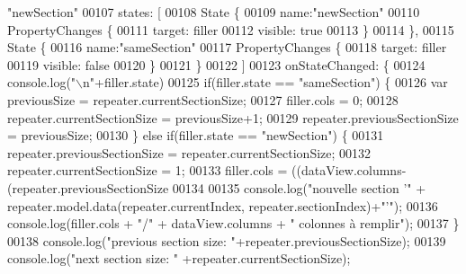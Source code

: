 \begin{DoxyCode}
{       "newSection"}
00107 \textcolor{comment}{                states: [}
00108 \textcolor{comment}{                    State \{}
00109 \textcolor{comment}{                        name:"newSection"}
00110 \textcolor{comment}{                        PropertyChanges \{}
00111 \textcolor{comment}{                            target: filler}
00112 \textcolor{comment}{                            visible: true}
00113 \textcolor{comment}{                        \}}
00114 \textcolor{comment}{                    \},}
00115 \textcolor{comment}{                    State \{}
00116 \textcolor{comment}{                        name:"sameSection"}
00117 \textcolor{comment}{                        PropertyChanges \{}
00118 \textcolor{comment}{                            target: filler}
00119 \textcolor{comment}{                            visible: false}
00120 \textcolor{comment}{                        \}}
00121 \textcolor{comment}{                    \}}
00122 \textcolor{comment}{                ]}
00123 \textcolor{comment}{                onStateChanged: \{}
00124 \textcolor{comment}{                    console.log("\(\backslash\)n"+filler.state)}
00125 \textcolor{comment}{                    if(filler.state == "sameSection") \{}
00126 \textcolor{comment}{                        var previousSize = repeater.currentSectionSize;}
00127 \textcolor{comment}{                        filler.cols = 0;}
00128 \textcolor{comment}{                        repeater.currentSectionSize = previousSize+1;}
00129 \textcolor{comment}{                        repeater.previousSectionSize = previousSize;}
00130 \textcolor{comment}{                    \} else if(filler.state == "newSection") \{}
00131 \textcolor{comment}{                        repeater.previousSectionSize = repeater.currentSectionSize;}
00132 \textcolor{comment}{                        repeater.currentSectionSize = 1;}
00133 \textcolor{comment}{                        filler.cols = ((dataView.columns-(repeater.previousSectionSize %
00134 \textcolor{comment}{}
00135 \textcolor{comment}{                        console.log("nouvelle section '" + repeater.model.data(repeater.currentIndex,
       repeater.sectionIndex)+"'");}
00136 \textcolor{comment}{                        console.log(filler.cols + "/" + dataView.columns + " colonnes à remplir");}
00137 \textcolor{comment}{                    \}}
00138 \textcolor{comment}{                    console.log("previous section size: "+repeater.previousSectionSize);}
00139 \textcolor{comment}{                    console.log("next section size: " +repeater.currentSectionSize);}
}
\end{DoxyCode}
